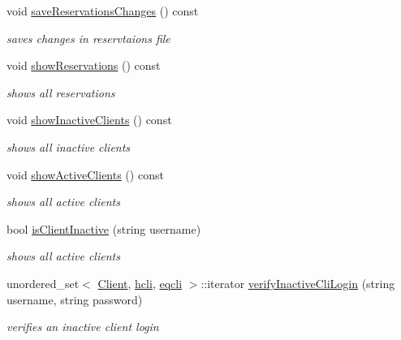 \begin{DoxyCompactItemize}
\hypertarget{class_company_ad9a63c107f1d1c763577961e42aae6c8}{}\label{class_company_ad9a63c107f1d1c763577961e42aae6c8} 
void \hyperlink{class_company_ad9a63c107f1d1c763577961e42aae6c8}{save\+Reservations\+Changes} () const
\begin{DoxyCompactList}\small\item\em saves changes in reservtaions file \end{DoxyCompactList}\item 
\hypertarget{class_company_a8b2eb7d77cf99fe734e052918c6f4b08}{}\label{class_company_a8b2eb7d77cf99fe734e052918c6f4b08} 
void \hyperlink{class_company_a8b2eb7d77cf99fe734e052918c6f4b08}{show\+Reservations} () const
\begin{DoxyCompactList}\small\item\em shows all reservations \end{DoxyCompactList}\item 
\hypertarget{class_company_a20317e24a5107625f509c445a65b43f5}{}\label{class_company_a20317e24a5107625f509c445a65b43f5} 
void \hyperlink{class_company_a20317e24a5107625f509c445a65b43f5}{show\+Inactive\+Clients} () const
\begin{DoxyCompactList}\small\item\em shows all inactive clients \end{DoxyCompactList}\item 
\hypertarget{class_company_a9738260db63d3cd96002523cb8fe911d}{}\label{class_company_a9738260db63d3cd96002523cb8fe911d} 
void \hyperlink{class_company_a9738260db63d3cd96002523cb8fe911d}{show\+Active\+Clients} () const
\begin{DoxyCompactList}\small\item\em shows all active clients \end{DoxyCompactList}\item 
bool \hyperlink{class_company_a5560238617d4a976c928bf06a6d955e7}{is\+Client\+Inactive} (string username)
\begin{DoxyCompactList}\small\item\em shows all active clients \end{DoxyCompactList}\item 
unordered\+\_\+set$<$ \hyperlink{class_client}{Client}, \hyperlink{structhcli}{hcli}, \hyperlink{structeqcli}{eqcli} $>$\+::iterator \hyperlink{class_company_ae861811b274bb4504cba29f9ee29b542}{verify\+Inactive\+Cli\+Login} (string username, string password)
\begin{DoxyCompactList}\small\item\em verifies an inactive client login \end{DoxyCompactList}\item 

\end{DoxyCompactItemize}
